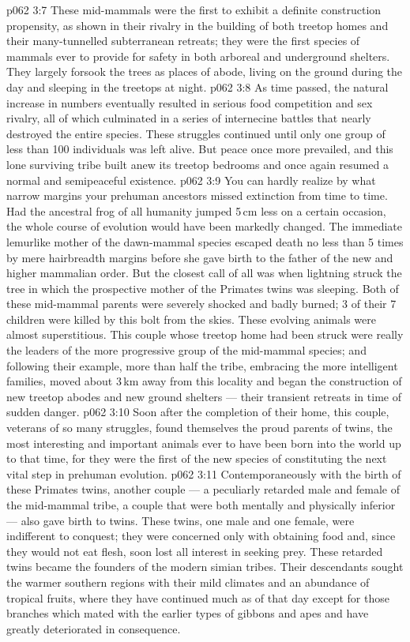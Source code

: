 \vs p062 3:7 These mid\hyp{}mammals were the first to exhibit a definite construction propensity, as shown in their rivalry in the building of both treetop homes and their many\hyp{}tunnelled subterranean retreats; they were the first species of mammals ever to provide for safety in both arboreal and underground shelters. They largely forsook the trees as places of abode, living on the ground during the day and sleeping in the treetops at night.
\vs p062 3:8 As time passed, the natural increase in numbers eventually resulted in serious food competition and sex rivalry, all of which culminated in a series of internecine battles that nearly destroyed the entire species. These struggles continued until only one group of less than 100 individuals was left alive. But peace once more prevailed, and this lone surviving tribe built anew its treetop bedrooms and once again resumed a normal and semipeaceful existence.
\vs p062 3:9 \pc You can hardly realize by what narrow margins your prehuman ancestors missed extinction from time to time. Had the ancestral frog of all humanity jumped 5\,cm less on a certain occasion, the whole course of evolution would have been markedly changed. The immediate lemurlike mother of the dawn\hyp{}mammal species escaped death no less than 5 times by mere hairbreadth margins before she gave birth to the father of the new and higher mammalian order. But the closest call of all was when lightning struck the tree in which the prospective mother of the Primates twins was sleeping. Both of these mid\hyp{}mammal parents were severely shocked and badly burned; 3 of their 7 children were killed by this bolt from the skies. These evolving animals were almost superstitious. This couple whose treetop home had been struck were really the leaders of the more progressive group of the mid\hyp{}mammal species; and following their example, more than half the tribe, embracing the more intelligent families, moved about 3\,km away from this locality and began the construction of new treetop abodes and new ground shelters --- their transient retreats in time of sudden danger.
\vs p062 3:10 Soon after the completion of their home, this couple, veterans of so many struggles, found themselves the proud parents of twins, the most interesting and important animals ever to have been born into the world up to that time, for they were the first of the new species of  constituting the next vital step in prehuman evolution.
\vs p062 3:11 \pc Contemporaneously with the birth of these Primates twins, another couple --- a peculiarly retarded male and female of the mid\hyp{}mammal tribe, a couple that were both mentally and physically inferior --- also gave birth to twins. These twins, one male and one female, were indifferent to conquest; they were concerned only with obtaining food and, since they would not eat flesh, soon lost all interest in seeking prey. These retarded twins became the founders of the modern simian tribes. Their descendants sought the warmer southern regions with their mild climates and an abundance of tropical fruits, where they have continued much as of that day except for those branches which mated with the earlier types of gibbons and apes and have greatly deteriorated in consequence.
